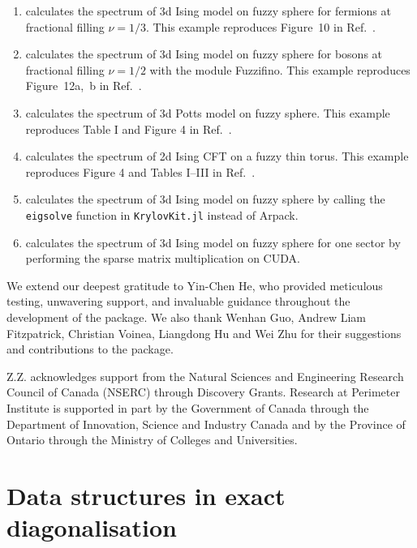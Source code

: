 \documentclass{timesjhep}
\begin{document}
\begin{enumerate}
    \item {} calculates the spectrum of 3d Ising model on fuzzy sphere for fermions at fractional filling $\nu = 1/3$. This example reproduces Figure~10 in Ref.~\cite{Voinea2024}.
    \item {} calculates the spectrum of 3d Ising model on fuzzy sphere for bosons at fractional filling $\nu = 1/2$ with the module Fuzzifino. This example reproduces Figure~12a,~b in Ref.~\cite{Voinea2024}.
    \item {} calculates the spectrum of 3d Potts model on fuzzy sphere. This example reproduces Table I and Figure 4 in Ref.~\cite{Yang2025}.
    \item {} calculates the spectrum of 2d Ising CFT on a fuzzy thin torus. This example reproduces Figure 4 and Tables I--III in Ref.~\cite{Han2025}.
    \item {} calculates the spectrum of 3d Ising model on fuzzy sphere by calling the \lstinline|eigsolve| function in \lstinline|KrylovKit.jl| instead of Arpack.
    \item {} calculates the spectrum of 3d Ising model on fuzzy sphere for one sector by performing the sparse matrix multiplication on CUDA.
\end{enumerate}

\acknowledgments

We extend our deepest gratitude to Yin-Chen He, who provided meticulous testing, unwavering support, and invaluable guidance throughout the development of the package. We also thank Wenhan Guo, Andrew Liam Fitzpatrick, Christian Voinea, Liangdong Hu and Wei Zhu for their suggestions and contributions to the package. 

Z.Z. acknowledges support from the Natural Sciences and Engineering Research Council of Canada (NSERC) through Discovery Grants. Research at Perimeter Institute is supported in part by the Government of Canada through the Department of Innovation, Science and Industry Canada and by the Province of Ontario through the Ministry of Colleges and Universities.

\cleardoublepage
\appendix

\section{Data structures in exact diagonalisation}
\label{app:data}
\end{document}
